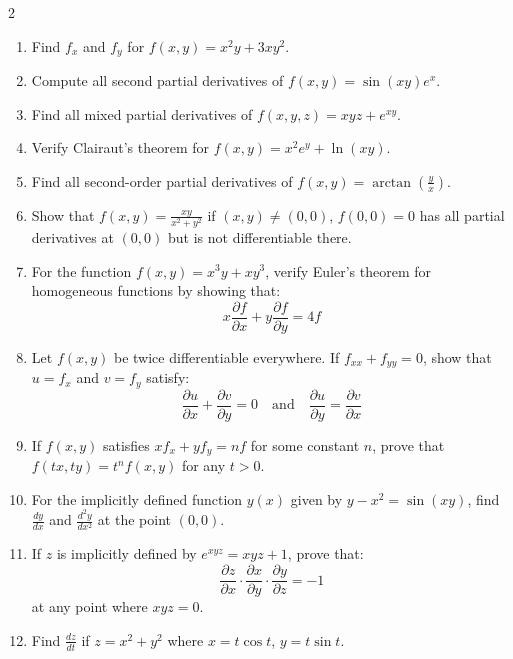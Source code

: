 \begin{multicols}{2}
\begin{enumerate}
\item Find $f_x$ and $f_y$ for $f(x,y) = x^2y + 3xy^2$.
    
    \item Compute all second partial derivatives of $f(x,y) = \sin(xy)e^x$.
    
    \item Find all mixed partial derivatives of $f(x,y,z) = xyz + e^{xy}$.
    
    \item Verify Clairaut's theorem for $f(x,y) = x^2e^y + \ln(xy)$.
    
    \item Find all second-order partial derivatives of $f(x,y) = \arctan(\frac{y}{x})$.
    
    \item Show that $f(x,y) = \frac{xy}{x^2 + y^2}$ if $(x,y) \neq (0,0)$, $f(0,0) = 0$ has all partial derivatives at $(0,0)$ but is not differentiable there.
    
    \item For the function $f(x,y) = x^3 y + x y^3$, verify Euler's theorem for homogeneous functions by showing that:
    \[
    x\frac{\partial f}{\partial x} + y\frac{\partial f}{\partial y} = 4f
    \]
    
    \item Let $f(x,y)$ be twice differentiable everywhere. If $f_{xx} + f_{yy} = 0$, show that $u = f_x$ and $v = f_y$ satisfy:
    \[
    \frac{\partial u}{\partial x} + \frac{\partial v}{\partial y} = 0 \quad \text{and} \quad \frac{\partial u}{\partial y} = \frac{\partial v}{\partial x}
    \]
    
    \item If $f(x,y)$ satisfies $xf_x + yf_y = nf$ for some constant $n$, prove that $f(tx,ty) = t^nf(x,y)$ for any $t > 0$.
    
    \item For the implicitly defined function $y(x)$ given by $y - x^2 = \sin(xy)$, find $\frac{dy}{dx}$ and $\frac{d^2y}{dx^2}$ at the point $(0, 0)$.
    
    \item If $z$ is implicitly defined by $e^{xyz} = xyz + 1$, prove that:
    \[
    \frac{\partial z}{\partial x} \cdot \frac{\partial x}{\partial y} \cdot \frac{\partial y}{\partial z} = -1
    \]
    at any point where $xyz = 0$.


    \item Find $\frac{dz}{dt}$ if $z = x^2 + y^2$ where $x = t\cos t$, $y = t\sin t$.
        

\end{enumerate}
\end{multicols}
